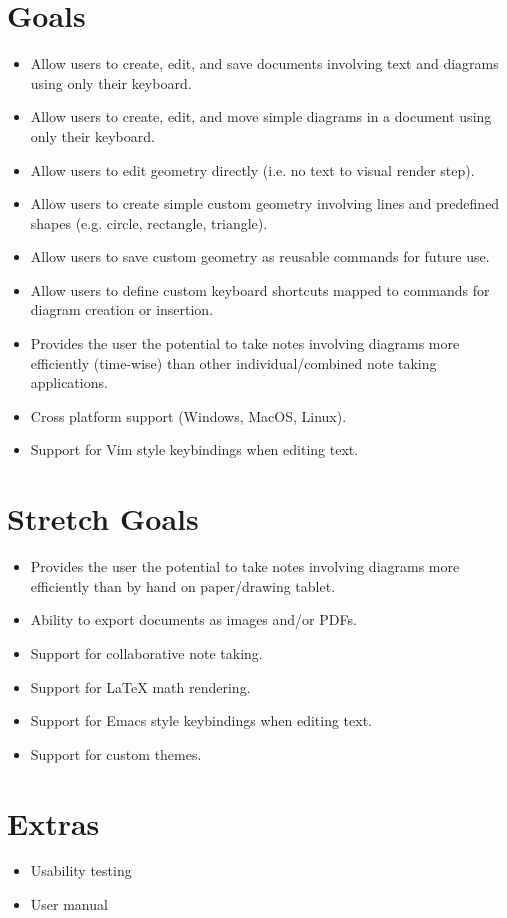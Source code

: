 \documentclass{article}
\begin{document}
\section{Goals}
\begin{itemize}
  \item Allow users to create, edit, and save documents involving text and
    diagrams using only their keyboard.
  \item Allow users to create, edit, and move simple diagrams in a document
    using only their keyboard.
  \item Allow users to edit geometry directly (i.e. no text to visual render
    step).
  \item Allow users to create simple custom geometry involving lines and
    predefined shapes (e.g. circle, rectangle, triangle).
  \item Allow users to save custom geometry as reusable commands for future
    use.
  \item Allow users to define custom keyboard shortcuts mapped to commands for
    diagram creation or insertion.
  \item Provides the user the potential to take notes involving diagrams more
    efficiently (time-wise) than other individual/combined note taking
    applications.
  \item Cross platform support (Windows, MacOS, Linux).
  \item Support for Vim style keybindings when editing text.
\end{itemize}

\section{Stretch Goals}
\begin{itemize}
  \item Provides the user the potential to take notes involving diagrams more
    efficiently than by hand on paper/drawing tablet.
  \item Ability to export documents as images and/or PDFs.
  \item Support for collaborative note taking.
  \item Support for LaTeX math rendering.
  \item Support for Emacs style keybindings when editing text.
  \item Support for custom themes.
\end{itemize}

\section{Extras}
\begin{itemize}
  \item Usability testing
  \item User manual
\end{itemize}
\end{document}
